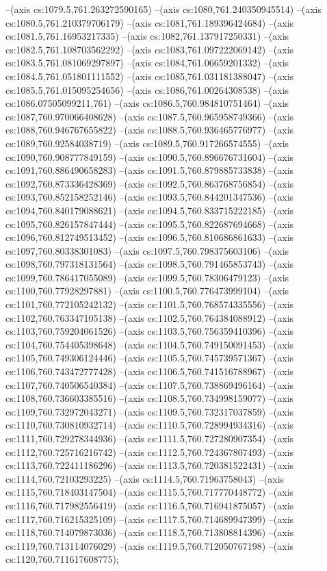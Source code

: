 --(axis cs:1079.5,761.263272590165)
--(axis cs:1080,761.240350945514)
--(axis cs:1080.5,761.210379706179)
--(axis cs:1081,761.189396424684)
--(axis cs:1081.5,761.16953217335)
--(axis cs:1082,761.137917250331)
--(axis cs:1082.5,761.108703562292)
--(axis cs:1083,761.097222069142)
--(axis cs:1083.5,761.081069297897)
--(axis cs:1084,761.06659201332)
--(axis cs:1084.5,761.051801111552)
--(axis cs:1085,761.031181388047)
--(axis cs:1085.5,761.015095254656)
--(axis cs:1086,761.00264308538)
--(axis cs:1086.07505099211,761)
--(axis cs:1086.5,760.984810751464)
--(axis cs:1087,760.970066408628)
--(axis cs:1087.5,760.965958749366)
--(axis cs:1088,760.946767655822)
--(axis cs:1088.5,760.936465776977)
--(axis cs:1089,760.92584038719)
--(axis cs:1089.5,760.917266574555)
--(axis cs:1090,760.908777849159)
--(axis cs:1090.5,760.896676731604)
--(axis cs:1091,760.886490658283)
--(axis cs:1091.5,760.879885733838)
--(axis cs:1092,760.873336428369)
--(axis cs:1092.5,760.863768756854)
--(axis cs:1093,760.852158252146)
--(axis cs:1093.5,760.844201347536)
--(axis cs:1094,760.840179088621)
--(axis cs:1094.5,760.833715222185)
--(axis cs:1095,760.826157847444)
--(axis cs:1095.5,760.822687694668)
--(axis cs:1096,760.812749513452)
--(axis cs:1096.5,760.810686861633)
--(axis cs:1097,760.80338301083)
--(axis cs:1097.5,760.798375603106)
--(axis cs:1098,760.797318131564)
--(axis cs:1098.5,760.791465853743)
--(axis cs:1099,760.786417055089)
--(axis cs:1099.5,760.78306479123)
--(axis cs:1100,760.77928297881)
--(axis cs:1100.5,760.776473999104)
--(axis cs:1101,760.772105242132)
--(axis cs:1101.5,760.768574335556)
--(axis cs:1102,760.763347105138)
--(axis cs:1102.5,760.764384088912)
--(axis cs:1103,760.759204061526)
--(axis cs:1103.5,760.756359410396)
--(axis cs:1104,760.754405398648)
--(axis cs:1104.5,760.749150091453)
--(axis cs:1105,760.749306124446)
--(axis cs:1105.5,760.745739571367)
--(axis cs:1106,760.743472777428)
--(axis cs:1106.5,760.741516788967)
--(axis cs:1107,760.740506540384)
--(axis cs:1107.5,760.738869496164)
--(axis cs:1108,760.736603385516)
--(axis cs:1108.5,760.734998159077)
--(axis cs:1109,760.732972043271)
--(axis cs:1109.5,760.732317037859)
--(axis cs:1110,760.730810932714)
--(axis cs:1110.5,760.728994934316)
--(axis cs:1111,760.729278344936)
--(axis cs:1111.5,760.727280907354)
--(axis cs:1112,760.725716216742)
--(axis cs:1112.5,760.724367807493)
--(axis cs:1113,760.722411186296)
--(axis cs:1113.5,760.720381522431)
--(axis cs:1114,760.72103293225)
--(axis cs:1114.5,760.71963758043)
--(axis cs:1115,760.718403147504)
--(axis cs:1115.5,760.717770448772)
--(axis cs:1116,760.717982556419)
--(axis cs:1116.5,760.716941875057)
--(axis cs:1117,760.716215325109)
--(axis cs:1117.5,760.714689947399)
--(axis cs:1118,760.714079873036)
--(axis cs:1118.5,760.713808814396)
--(axis cs:1119,760.713114076029)
--(axis cs:1119.5,760.712050767198)
--(axis cs:1120,760.711617608775);

